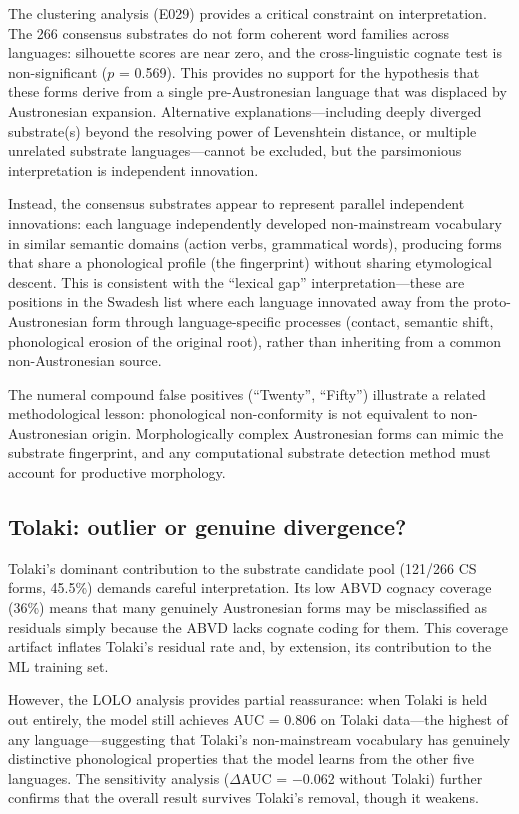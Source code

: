 \documentclass[12pt]{article}
\begin{document}
The clustering analysis (E029) provides a critical constraint on interpretation.
The 266 consensus substrates do not form coherent word families across languages: silhouette scores are near zero, and the cross-linguistic cognate test is non-significant ($p$ = 0.569).
This provides no support for the hypothesis that these forms derive from a single pre-Austronesian language that was displaced by Austronesian expansion.
Alternative explanations---including deeply diverged substrate(s) beyond the resolving power of Levenshtein distance, or multiple unrelated substrate languages---cannot be excluded, but the parsimonious interpretation is independent innovation.

Instead, the consensus substrates appear to represent parallel independent innovations: each language independently developed non-mainstream vocabulary in similar semantic domains (action verbs, grammatical words), producing forms that share a phonological profile (the fingerprint) without sharing etymological descent.
This is consistent with the ``lexical gap'' interpretation---these are positions in the Swadesh list where each language innovated away from the proto-Austronesian form through language-specific processes (contact, semantic shift, phonological erosion of the original root), rather than inheriting from a common non-Austronesian source.

The numeral compound false positives (``Twenty'', ``Fifty'') illustrate a related methodological lesson: phonological non-conformity is not equivalent to non-Austronesian origin.
Morphologically complex Austronesian forms can mimic the substrate fingerprint, and any computational substrate detection method must account for productive morphology.

\subsection{Tolaki: outlier or genuine divergence?}

Tolaki's dominant contribution to the substrate candidate pool (121/266 CS forms, 45.5\%) demands careful interpretation.
Its low ABVD cognacy coverage (36\%) means that many genuinely Austronesian forms may be misclassified as residuals simply because the ABVD lacks cognate coding for them.
This coverage artifact inflates Tolaki's residual rate and, by extension, its contribution to the ML training set.

However, the LOLO analysis provides partial reassurance: when Tolaki is held out entirely, the model still achieves AUC = 0.806 on Tolaki data---the highest of any language---suggesting that Tolaki's non-mainstream vocabulary has genuinely distinctive phonological properties that the model learns from the other five languages.
The sensitivity analysis ($\Delta$AUC = $-$0.062 without Tolaki) further confirms that the overall result survives Tolaki's removal, though it weakens.
\end{document}
